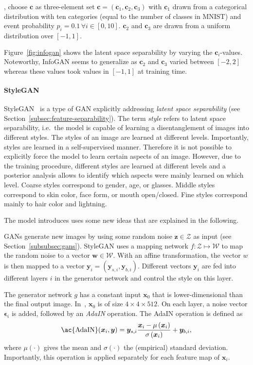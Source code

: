 , \citet{chen2016infogan} choose $\bm{c}$ as three-element set $\bm{c} = (\bm{c}_1, \bm{c}_2, \bm{c}_3)$ with $\bm{c}_1$ drawn from a categorical distribution with ten categories (equal to the number of classes in MNIST) and event probability $p_i=0.1 \, \forall i \in [0, 10]$.
$\bm{c}_2$ and $\bm{c}_3$ are drawn from a uniform distribution over $[-1, 1]$.

Figure~\ref{fig:infogan} shows the latent space separability by varying the $\bm{c}_i$-values.
Noteworthy, InfoGAN seems to generalize as $\bm{c}_2$ and $\bm{c}_3$ varied between $[-2, 2]$ whereas these values took values in $[-1, 1]$ at training time.

\paragraph{StyleGAN}
StyleGAN~\citep{karras2019style} is a type of \ac{GAN} explicitly addressing \textit{latent space separability} (see Section~\ref{subsec:feature-separability}).
The term \textit{style} refers to latent space separability, i.e.~the model is capable of learning a disentanglement of images into different styles.
The styles of an image are learned at different levels.
Importantly, styles are learned in a self-supervised manner.
Therefore it is not possible to explicitly force the model to learn certain aspects of an image.
However, due to the training procedure, different styles are learned at different levels and a posterior analysis allows to identify which aspects were mainly learned on which level.
Coarse styles correspond to gender, age, or glasses.
Middle styles correspond to skin color, face form, or mouth open/closed.
Fine styles correspond mainly to hair color and lightning.

The model introduces uses some new ideas that are explained in the following.

\acp{GAN} generate new images by using some random noise $\bm{z}\in \mathcal{Z}$ as input (see Section~\ref{subsubsec:gans}).
StyleGAN uses a mapping network $f: \mathcal{Z}\mapsto \mathcal{W}$ to map the random noise to a vector $\bm{w}\in \mathcal{W}$.
With an affine transformation, the vector $w$ is then mapped to a vector $\bm{y}_i = (\bm{y}_{s,i}, \bm{y}_{b,i})$.
Different vectors $\bm{y}_i$ are fed into different layers $i$ in the generator network and control the style on this layer.

The generator network $g$ has a constant input $\bm{x}_0$ that is lower-dimensional than the final output image.
In~\citet{karras2019style}, $\bm{x}_0$ is of size $4\times 4\times 512$.
On each layer, a noise vector $\bm{\epsilon}_i$ is added, followed by an \textit{\acf{AdaIN}} operation.
The \ac{AdaIN} operation is defined as
\begin{align}
    \text{\ac{AdaIN}}(\bm{x}_i, \bm{y}) = \bm{y}_{s, i} \frac{\bm{x}_{i}-\mu\left(\bm{x}_{i}\right)}{\sigma\left(\bm{x}_{i}\right)}+\bm{y}_{b, i},
\end{align}
\citep{karras2019style} where $\mu(\cdot)$ gives the mean and $\sigma(\cdot)$ the (empirical) standard deviation.
Importantly, this operation is applied separately for each feature map of $\bm{x}_i$.

